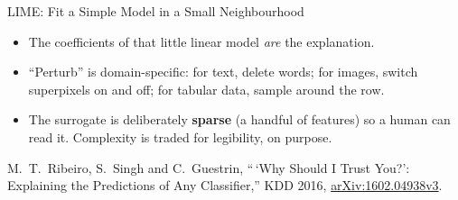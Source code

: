 \begin{frame}{LIME: Fit a Simple Model in a Small Neighbourhood}

    \centering

    \vspace{1.0em}

    \raggedright
    \begin{itemize}
        \setlength\itemsep{0.4em}
        \item The coefficients of that little linear model \emph{are} the explanation.
        \item ``Perturb'' is domain-specific: for text, delete words; for images, switch
              superpixels on and off; for tabular data, sample around the row.
        \item The surrogate is deliberately \textbf{sparse} (a handful of features) so a human can
              read it. Complexity is traded for legibility, on purpose.
    \end{itemize}

    \vspace{0.4em}
    {\scriptsize M.~T.~Ribeiro, S.~Singh and C.~Guestrin, ``\,`Why Should I Trust You?': Explaining
    the Predictions of Any Classifier,'' KDD 2016,
    \href{https://arxiv.org/abs/1602.04938v3}{arXiv:1602.04938v3}.}
\end{frame}

